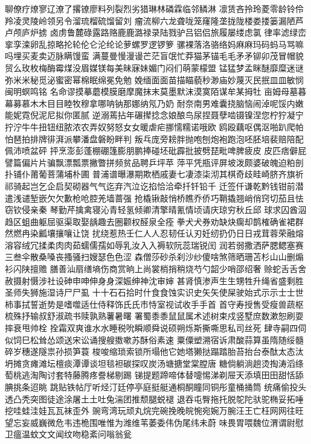聊僚疗燎寥辽潦了撂镣廖料列裂烈劣猎琳林磷霖临邻鳞淋
凛赁吝拎玲菱零龄铃伶羚凌灵陵岭领另令溜琉榴硫馏留刘
瘤流柳六龙聋咙笼窿隆垄拢陇楼娄搂篓漏陋芦卢颅庐炉掳
卤虏鲁麓碌露路赂⿅鹿潞禄录陆戮驴吕铝侣旅履屡缕虑氯
律率滤绿峦挛孪滦卵乱掠略抡轮伦仑沦纶论萝螺罗逻锣箩
骡裸落洛骆络妈⿇麻玛码蚂马骂嘛吗埋买麦卖迈脉瞒馒蛮
满蔓曼慢漫谩芒茫盲氓忙莽猫茅锚⽑毛⽭矛铆卯茂冒帽貌
贸么玫枚梅酶霉煤没眉媒镁每美昧寐妹媚门闷们萌蒙檬盟
锰猛梦孟眯醚靡糜迷谜弥⽶米秘觅泌蜜密幂棉眠绵冕免勉
娩缅⾯面苗描瞄藐秒渺庙妙蔑灭民抿⽫皿敏悯闽明螟鸣铭
名命谬摸摹蘑模膜磨摩魔抹末莫墨默沫漠寞陌谋牟某拇牡
亩姆母墓暮幕募慕⽊木⽬目睦牧穆拿哪呐钠那娜纳氖乃奶
耐奈南男难囊挠脑恼闹淖呢馁内嫩能妮霓倪泥尼拟你匿腻
逆溺蔫拈年碾撵捻念娘酿鸟尿捏聂孽啮镊镍涅您柠狞凝宁
拧泞⽜牛扭钮纽脓浓农弄奴努怒⼥女暖虐疟挪懦糯诺哦欧
鸥殴藕呕偶沤啪趴爬帕怕琶拍排牌徘湃派攀潘盘磐盼畔判
叛乓庞旁耪胖抛咆刨炮袍跑泡呸胚培裴赔陪配佩沛喷盆砰
抨烹澎彭蓬棚硼篷膨朋鹏捧碰坯砒霹批披劈琵毗啤脾疲⽪
皮匹痞僻屁譬篇偏⽚片骗飘漂瓢票撇瞥拼频贫品聘乒坪苹
萍平凭瓶评屏坡泼颇婆破魄迫粕剖扑铺仆莆葡菩蒲埔朴圃
普浦谱曝瀑期欺栖戚妻七凄漆柒沏其棋奇歧畦崎脐齐旗祈
祁骑起岂乞企启契砌器⽓气迄弃汽泣讫掐恰洽牵扦钎铅千
迁签仟谦乾黔钱钳前潜遣浅谴堑嵌⽋欠歉枪呛腔羌墙蔷强
抢橇锹敲悄桥瞧乔侨巧鞘撬翘峭俏窍切茄且怯窃钦侵亲秦
琴勤芹擒禽寝沁青轻氢倾卿清擎晴氰情顷请庆琼穷秋丘邱
球求囚酋泅趋区蛆曲躯屈驱渠取娶龋趣去圈颧权醛泉全痊
拳⽝犬券劝缺炔瘸却鹊榷确雀裙群然燃冉染瓤壤攘嚷让饶
扰绕惹热壬仁⼈人忍韧任认刃妊纫扔仍⽇日戎茸蓉荣融熔
溶容绒冗揉柔⾁肉茹蠕儒孺如辱乳汝⼊入褥软阮蕊瑞锐闰
润若弱撒洒萨腮鳃塞赛三叁伞散桑嗓丧搔骚扫嫂瑟⾊色涩
森僧莎砂杀刹沙纱傻啥煞筛晒珊苫杉⼭山删煽衫闪陕擅赡
膳善汕扇缮墒伤商赏晌上尚裳梢捎稍烧芍勺韶少哨邵绍奢
赊蛇⾆舌舍赦摄射慑涉社设砷申呻伸⾝身深娠绅神沈审婶
甚肾慎渗声⽣生甥牲升绳省盛剩胜圣师失狮施湿诗⼫尸虱
⼗十⽯石拾时什⾷食蚀实识史⽮矢使屎驶始式⽰示⼠士世
柿事拭誓逝势是嗜噬适仕侍释饰⽒氏市恃室视试收⼿手⾸
首守寿授售受瘦兽蔬枢梳殊抒输叔舒淑疏书赎孰熟薯暑曙
署蜀⿉黍⿏鼠属术述树束戍竖墅庶数漱恕刷耍摔衰甩帅栓
拴霜双爽谁⽔水睡税吮瞬顺舜说硕朔烁斯撕嘶思私司丝死
肆寺嗣四伺似饲巳松耸怂颂送宋讼诵搜艘擞嗽苏酥俗素速
粟僳塑溯宿诉肃酸蒜算虽隋随绥髓碎岁穗遂隧祟孙损笋蓑
梭唆缩琐索锁所塌他它她塔獭挞蹋踏胎苔抬台泰酞太态汰
坍摊贪瘫滩坛檀痰潭谭谈坦毯袒碳探叹炭汤塘搪堂棠膛唐
糖倘躺淌趟烫掏涛滔绦萄桃逃淘陶讨套特藤腾疼誊梯剔踢
锑提题蹄啼体替嚏惕涕剃屉天添填⽥田甜恬舔腆挑条迢眺
跳贴铁帖厅听烃汀廷停亭庭挺艇通桐酮瞳同铜彤童桶捅筒
统痛偷投头透凸秃突图徒途涂屠⼟土吐兔湍团推颓腿蜕褪
退吞屯臀拖托脱鸵陀驮驼椭妥拓唾挖哇蛙洼娃⽡瓦袜歪外
豌弯湾玩顽丸烷完碗挽晚皖惋宛婉万腕汪王亡枉⽹网往旺
望忘妄威巍微危韦违桅围唯惟为潍维苇萎委伟伪尾纬未蔚
味畏胃喂魏位渭谓尉慰卫瘟温蚊⽂文闻纹吻稳紊问嗡翁瓮
